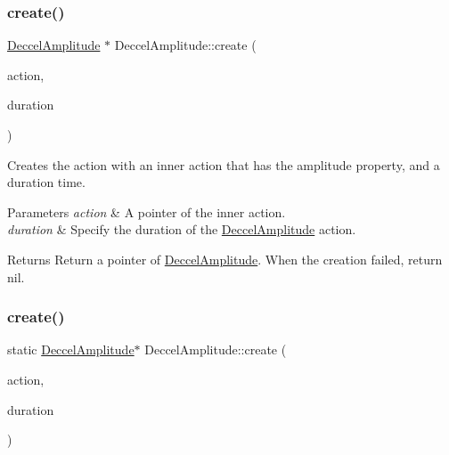 \subsubsection{\texorpdfstring{create()}{create()}\hspace{0.1cm}{\footnotesize\ttfamily [1/2]}}
{\footnotesize\ttfamily \hyperlink{classDeccelAmplitude}{Deccel\+Amplitude} $\ast$ Deccel\+Amplitude\+::create (\begin{DoxyParamCaption}\item[{\hyperlink{classAction}{Action} $\ast$}]{action,  }\item[{float}]{duration }\end{DoxyParamCaption})\hspace{0.3cm}{\ttfamily [static]}}



Creates the action with an inner action that has the amplitude property, and a duration time. 


\begin{DoxyParams}{Parameters}
{\em action} & A pointer of the inner action. \\
\hline
{\em duration} & Specify the duration of the \hyperlink{classDeccelAmplitude}{Deccel\+Amplitude} action. \\
\hline
\end{DoxyParams}
\begin{DoxyReturn}{Returns}
Return a pointer of \hyperlink{classDeccelAmplitude}{Deccel\+Amplitude}. When the creation failed, return nil. 
\end{DoxyReturn}
\mbox{\label{classDeccelAmplitude_adeb695c02981198a7dd6dddda6a2f3d1}} 
\subsubsection{\texorpdfstring{create()}{create()}\hspace{0.1cm}{\footnotesize\ttfamily [2/2]}}
{\footnotesize\ttfamily static \hyperlink{classDeccelAmplitude}{Deccel\+Amplitude}$\ast$ Deccel\+Amplitude\+::create (\begin{DoxyParamCaption}\item[{\hyperlink{classAction}{Action} $\ast$}]{action,  }\item[{float}]{duration }\end{DoxyParamCaption})\hspace{0.3cm}{\ttfamily [static]}}



